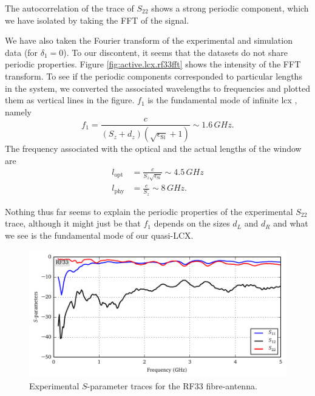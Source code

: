 The autocorrelation of the trace of $S_{22}$ shows a strong
periodic component, which we have isolated by taking the 
FFT of the signal. 

We have also taken the Fourier transform of the experimental
and simulation data (for $\delta_1=0$). To our discontent, 
it seems that the datasets do not share periodic properties. 
Figure \ref{fig:active.lcx.rf33fft} shows the intensity
of the FFT transform. To see if the periodic components corresponded
to particular lengths in the system, we converted the associated
wavelengths to frequencies and plotted them as vertical lines in the figure. 
$f_1$ is the fundamental mode of infinite \gls{lcx} \cite{WAN2001}, namely
  \begin{equation}
   f_1 = \frac{c}{\left(S_z+d_z\right)\left(\sqrt{\epsilon_\text{Si}}+1\right)} \sim 1.6\,\unit{GHz}.
  \end{equation}
The frequency associated with the optical and the actual lengths of the window
are
  \begin{align*}
   l_\text{opt}	&= \frac{c}{S_z\sqrt{\epsilon_\text{Si}}} \sim 4.5\,\unit{GHz}	\\
   l_\text{phy}	&= \frac{c}{S_z} \sim 8\,\unit{GHz}.
  \end{align*}

Nothing thus far seems to explain the periodic properties of the 
experimental $S_{22}$ trace, although it might just be that 
$f_1$ depends on the sizes $d_L$ and $d_R$ and what we see is
the fundamental mode of our quasi-LCX. 

\begin{figure}
 \centering
 \includegraphics{figs/active/RF33-sParameters.pdf}
 \caption[Experimental $S$-parameter traces for the RF33 fibre-antenna]
 		{Experimental $S$-parameter traces for the RF33 fibre-antenna.}
 \label{fig:active.lcx.rf33sParameters}
\end{figure}

